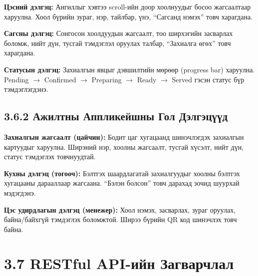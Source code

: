 \textbf{Цэсний дэлгэц:} Ангиллыг хэвтээ scroll-ийн доор хоолнуудыг босоо жагсаалтаар
харуулна. Хоол бүрийн зураг, нэр, тайлбар, үнэ, ``Сагсанд нэмэх'' товч харагдана.

\textbf{Сагсны дэлгэц:} Сонгосон хоолдуудын жагсаалт, тоо ширхэгийн засварлах боломж,
нийт дүн, тусгай тэмдэглэл оруулах талбар, ``Захиалга өгөх'' товч харагдана.

\textbf{Статусын дэлгэц:} Захиалгын явцыг дэвшилтийн мөрөөр (progress bar) харуулна.
Pending $\rightarrow$ Confirmed $\rightarrow$ Preparing $\rightarrow$ Ready $\rightarrow$ Served
гэсэн статус бүр тэмдэглэгдэнэ.

\subsection{3.6.2 Ажилтны Аппликейшны Гол Дэлгэцүүд}

\textbf{Захиалгын жагсаалт (цайчин):} Бодит цаг хугацаанд шинэчлэгдэх захиалгын
картуудыг харуулна. Ширэний нэр, хоолны жагсаалт, тусгай хүсэлт, нийт дүн,
статус тэмдэглэх товчнуудтай.

\textbf{Кухны дэлгэц (тогооч):} Бэлтгэх шаардлагатай захиалгуудыг хоолны
бэлтгэх хугацааны дарааллаар жагсаана. ``Бэлэн болсон'' товч дарахад зочид
шуурхай мэдэгдэнэ.

\textbf{Цэс удирдлагын дэлгэц (менежер):} Хоол нэмэх, засварлах, зураг оруулах,
байна/байхгүй тэмдэглэх боломжтой. Ширээ бүрийн QR код шинэчлэх товч байна.

\section{3.7 RESTful API-ийн Загварчлал}

